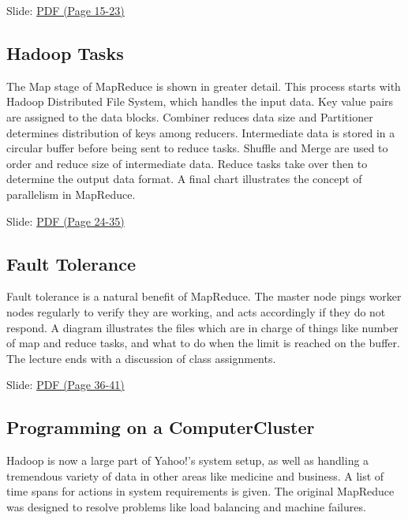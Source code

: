 
  Slide:
  \href{https://drive.google.com/open?id=0B88HKpainTSfMnpCelpNQUpNdVE}{PDF
  (Page 15-23)}

\subsection{Hadoop Tasks}

The Map stage of MapReduce is shown in greater detail. This process
starts with Hadoop Distributed File System, which handles the input
data. Key value pairs are assigned to the data blocks. Combiner reduces
data size and Partitioner determines distribution of keys among
reducers. Intermediate data is stored in a circular buffer before being
sent to reduce tasks. Shuffle and Merge are used to order and reduce
size of intermediate data. Reduce tasks take over then to determine the
output data format. A final chart illustrates the concept of parallelism
in MapReduce.


  Slide:
  \href{https://drive.google.com/open?id=0B88HKpainTSfMnpCelpNQUpNdVE}{PDF
  (Page 24-35)}

\subsection{Fault Tolerance}

Fault tolerance is a natural benefit of MapReduce. The master node pings
worker nodes regularly to verify they are working, and acts accordingly
if they do not respond. A diagram illustrates the files which are in
charge of things like number of map and reduce tasks, and what to do
when the limit is reached on the buffer. The lecture ends with a
discussion of class assignments.


  Slide:
  \href{https://drive.google.com/open?id=0B88HKpainTSfMnpCelpNQUpNdVE}{PDF
  (Page 36-41)}

\subsection{Programming on a ComputerCluster}

Hadoop is now a large part of Yahoo!'s system setup, as well as handling
a tremendous variety of data in other areas like medicine and business.
A list of time spans for actions in system requirements is given. The
original MapReduce was designed to resolve problems like load balancing
and machine failures.

